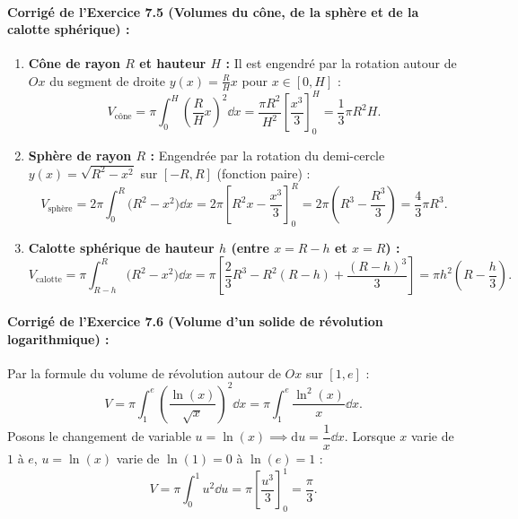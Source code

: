 \paragraph{Corrigé de l'Exercice 7.5 (Volumes du cône, de la sphère et de la calotte sphérique) :}
\begin{enumerate}[label=(\alph*)]
    \item \textbf{Cône de rayon $R$ et hauteur $H$ :} Il est engendré par la rotation autour de $Ox$ du segment de droite $y(x) = \frac{R}{H}x$ pour $x \in [0, H]$ :
    \[
        V_{\text{cône}} = \pi \int_0^H \left(\frac{R}{H}x\right)^2\dd x = \frac{\pi R^2}{H^2}\left[\frac{x^3}{3}\right]_0^H = \boxed{\frac{1}{3}\pi R^2 H}.
    \]
    \item \textbf{Sphère de rayon $R$ :} Engendrée par la rotation du demi-cercle $y(x) = \sqrt{R^2 - x^2}$ sur $[-R, R]$ (fonction paire) :
    \[
        V_{\text{sphère}} = 2\pi \int_0^R \bigl(R^2 - x^2\bigr)\dd x = 2\pi\left[R^2 x - \frac{x^3}{3}\right]_0^R = 2\pi\left(R^3 - \frac{R^3}{3}\right) = \boxed{\frac{4}{3}\pi R^3}.
    \]
    \item \textbf{Calotte sphérique de hauteur $h$ (entre $x = R - h$ et $x = R$) :}
    \[
        V_{\text{calotte}} = \pi \int_{R-h}^R \bigl(R^2 - x^2\bigr)\dd x = \pi\left[\frac{2}{3}R^3 - R^2(R-h) + \frac{(R-h)^3}{3}\right] = \boxed{\pi h^2\left(R - \frac{h}{3}\right)}.
    \]
\end{enumerate}

\paragraph{Corrigé de l'Exercice 7.6 (Volume d'un solide de révolution logarithmique) :}
Par la formule du volume de révolution autour de $Ox$ sur $[1, e]$ :
\[
    V = \pi \int_1^e \left(\frac{\ln(x)}{\sqrt{x}}\right)^2\dd x = \pi \int_1^e \frac{\ln^2(x)}{x}\dd x.
\]
Posons le changement de variable $u = \ln(x) \implies \mathrm{d}u = \dfrac{1}{x}\dd x$. Lorsque $x$ varie de $1$ à $e$, $u = \ln(x)$ varie de $\ln(1) = 0$ à $\ln(e) = 1$ :
\[
    V = \pi \int_0^1 u^2\dd u = \pi\left[\frac{u^3}{3}\right]_0^1 = \boxed{\frac{\pi}{3}}.
\]
